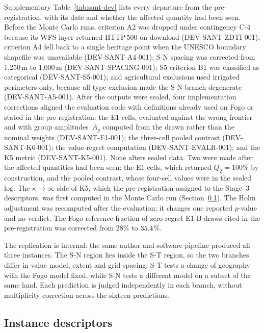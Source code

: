 Supplementary Table~\ref{tab:sant-dev} lists every departure from the
pre-registration, with its date and whether the affected quantity had
been seen.
Before the Monte Carlo runs, criterion A2 was dropped under contingency
C-4 because its WFS layer returned HTTP\,500 on download
(DEV-SANT-ZDTI-001);
criterion A4 fell back to a single heritage point when the UNESCO boundary
shapefile was unavailable (DEV-SANT-A4-001);
S-N spacing was corrected from 1{,}250\,m to 1{,}000\,m
(DEV-SANT-SPACING-001);
S5 criterion B1 was classified as categorical (DEV-SANT-S5-001);
and agricultural exclusions used irrigated perimeters only, because
all-type exclusion made the S-N branch degenerate (DEV-SANT-A5-001).
After the outputs were sealed, four implementation corrections aligned
the evaluation code with definitions already used on Fogo or stated in
the pre-registration:
the E1 cells, evaluated against the wrong frontier and with
group amplitudes~$\bar A_g$ computed from the drawn rather than the
nominal weights (DEV-SANT-E1-001);
the three-cell pooled contrast (DEV-SANT-K6-001);
the value-regret computation (DEV-SANT-EVALR-001);
and the K5 metric (DEV-SANT-K5-001).
None alters sealed data.
Two were made after the affected quantities had been seen:
the E1 cells, which returned $Q_2=100\%$ by construction,
and the pooled contrast, whose four-cell values were in the sealed log.
The $\kappa\!\to\!\infty$ side of K5, which the pre-registration assigned
to the Stage~3 descriptors, was first computed in the Monte Carlo run
(Section~\ref{sec:santiago-instances}).
The Holm adjustment was recomputed after the evaluation; it changes one
reported $p$-value and no verdict.
The Fogo reference fraction of zero-regret E1-B draws cited in the
pre-registration was corrected from 28\% to $35.4$\%.

The replication is internal: the same author and software pipeline
produced all three instances.
The S-N region lies inside the S-T region, so the two branches differ
in value model, extent and grid spacing: S-T tests a change of geography
with the Fogo model fixed, while S-N tests a different model on a
subset of the same land.
Each prediction is judged independently in each branch, without
multiplicity correction across the sixteen predictions.

\subsection{Instance descriptors}
\label{sec:santiago-instances}

